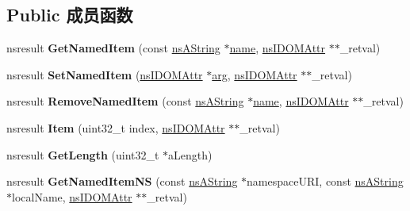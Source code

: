 \subsection*{Public 成员函数}
\begin{DoxyCompactItemize}
\item 
\mbox{\label{interfacens_i_d_o_m_moz_named_attr_map_afd301fc68712149af538fd77fff07358}} 
nsresult {\bfseries Get\+Named\+Item} (const \hyperlink{structns_string_container}{ns\+A\+String} $\ast$\hyperlink{structname}{name}, \hyperlink{interfacens_i_d_o_m_attr}{ns\+I\+D\+O\+M\+Attr} $\ast$$\ast$\+\_\+retval)
\item 
\mbox{\label{interfacens_i_d_o_m_moz_named_attr_map_a5c342d132019a254e24b43bd830daf73}} 
nsresult {\bfseries Set\+Named\+Item} (\hyperlink{interfacens_i_d_o_m_attr}{ns\+I\+D\+O\+M\+Attr} $\ast$\hyperlink{interfacevoid}{arg}, \hyperlink{interfacens_i_d_o_m_attr}{ns\+I\+D\+O\+M\+Attr} $\ast$$\ast$\+\_\+retval)
\item 
\mbox{\label{interfacens_i_d_o_m_moz_named_attr_map_a976ef8d5d4fd6705b4ccee8dd461073d}} 
nsresult {\bfseries Remove\+Named\+Item} (const \hyperlink{structns_string_container}{ns\+A\+String} $\ast$\hyperlink{structname}{name}, \hyperlink{interfacens_i_d_o_m_attr}{ns\+I\+D\+O\+M\+Attr} $\ast$$\ast$\+\_\+retval)
\item 
\mbox{\label{interfacens_i_d_o_m_moz_named_attr_map_ab9274c2e95003a406a0b80587614290b}} 
nsresult {\bfseries Item} (uint32\+\_\+t index, \hyperlink{interfacens_i_d_o_m_attr}{ns\+I\+D\+O\+M\+Attr} $\ast$$\ast$\+\_\+retval)
\item 
\mbox{\label{interfacens_i_d_o_m_moz_named_attr_map_a4779a34959878c2dd0ba9d117a44d88c}} 
nsresult {\bfseries Get\+Length} (uint32\+\_\+t $\ast$a\+Length)
\item 
\mbox{\label{interfacens_i_d_o_m_moz_named_attr_map_a7bf8d0f1ac2bf171ff613c0de00dbc81}} 
nsresult {\bfseries Get\+Named\+Item\+NS} (const \hyperlink{structns_string_container}{ns\+A\+String} $\ast$namespace\+U\+RI, const \hyperlink{structns_string_container}{ns\+A\+String} $\ast$local\+Name, \hyperlink{interfacens_i_d_o_m_attr}{ns\+I\+D\+O\+M\+Attr} $\ast$$\ast$\+\_\+retval)
$$
\end{DoxyCompactItemize}
